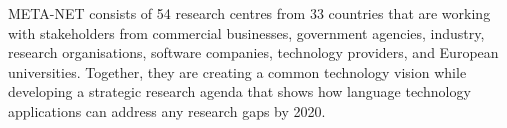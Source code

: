 \begin{Parallel}[c]{78mm}{78mm}
{META-NET consists of 54 research centres from 33 countries that are working with stakeholders from commercial businesses, government agencies, industry, research organisations, software companies, technology providers, and European universities. 
Together, they are creating a common technology vision while developing a strategic research agenda that shows how language technology applications can address any research gaps by 2020.
} 
\ParallelPar
\end{Parallel}




\cleardoublepage


\tableofcontents



\cleardoublepage

\setcounter{page}{1}
\pagestyle{scrheadings}



